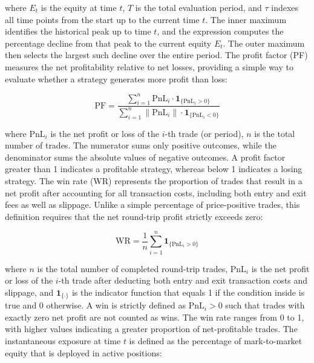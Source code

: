 \documentclass[12pt, a4paper]{article}
\begin{document}
where \(E_t\) is the equity at time \(t\), \(T\) is the total evaluation period, and \(\tau\) indexes all time points from the start up to the current time \(t\). 
The inner maximum identifies the historical peak up to time \(t\), and the expression computes the percentage decline from that peak to the current equity \(E_t\). 
The outer maximum then selects the largest such decline over the entire period.
The profit factor (PF) measures the net profitability relative to net losses, providing a simple way to evaluate whether a strategy generates more profit than loss:

\begin{equation}
    \text{PF} = \frac{\sum_{i=1}^{n} \text{PnL}_i \cdot \mathbf{1}_{\{\text{PnL}_i > 0\}}}{\sum_{i=1}^{n} \left\|\text{PnL}_i\right\| \cdot \mathbf{1}_{\{\text{PnL}_i < 0\}}}
    \label{eq:profit_factor}
\end{equation}

where \(\text{PnL}_i\) is the net profit or loss of the \(i\)-th trade (or period), \(n\) is the total number of trades. The numerator sums only positive outcomes, 
while the denominator sums the absolute values of negative outcomes. A profit factor greater than 1 indicates a profitable strategy, whereas below 1 indicates a losing strategy.
The win rate (WR) represents the proportion of trades that result in a net profit after accounting for all transaction costs, including both entry and exit fees as well as slippage. 
Unlike a simple percentage of price-positive trades, this definition requires that the net round-trip profit strictly exceeds zero:

\begin{equation}
    \text{WR} = \frac{1}{n} \sum_{i=1}^{n} \mathbf{1}_{\{\text{PnL}_i > 0\}}
    \label{eq:win_rate}
\end{equation}

where \(n\) is the total number of completed round-trip trades, \(\text{PnL}_i\) is the net profit or loss of the \(i\)-th trade after deducting both entry and exit transaction costs and 
slippage, and \(\mathbf{1}_{\{\cdot\}}\) is the indicator function that equals 1 if the condition inside is true and 0 otherwise. 
A win is strictly defined as \(\text{PnL}_i > 0\) such that trades with exactly zero net profit are not counted as wins. The win rate ranges from 0 to 1, 
with higher values indicating a greater proportion of net-profitable trades.
The instantaneous exposure at time \(t\) is defined as the percentage of mark-to-market equity that is deployed in active positions:
\end{document}
